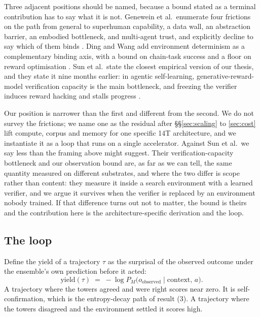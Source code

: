 \documentclass[11pt]{article}
\begin{document}
Three adjacent positions should be named, because a bound stated as a terminal contribution has to say what it is not. Genewein et al.\ enumerate four frictions on the path from general to superhuman capability, a data wall, an abstraction barrier, an embodied bottleneck, and multi-agent trust, and explicitly decline to say which of them binds \cite{genewein2026asi}. Ding and Wang add environment determinism as a complementary binding axis, with a bound on chain-task success and a floor on reward optimisation \cite{ding2026grounded}. Sun et al.\ state the closest empirical version of our thesis, and they state it nine months earlier: in agentic self-learning, generative-reward-model verification capacity is the main bottleneck, and freezing the verifier induces reward hacking and stalls progress \cite{sun2025agentic}.

Our position is narrower than the first and different from the second. We do not survey the frictions; we name one as the residual after \S\S\ref{sec:scaling} to \ref{sec:cost} lift compute, corpus and memory for one specific 14T architecture, and we instantiate it as a loop that runs on a single accelerator. Against Sun et al.\ we say less than the framing above might suggest. Their verification-capacity bottleneck and our observation bound are, as far as we can tell, the same quantity measured on different substrates, and where the two differ is scope rather than content: they measure it inside a search environment with a learned verifier, and we argue it survives when the verifier is replaced by an environment nobody trained. If that difference turns out not to matter, the bound is theirs and the contribution here is the architecture-specific derivation and the loop.

\subsection{The loop}

Define the yield of a trajectory $\tau$ as the surprisal of the observed outcome under the ensemble's own prediction before it acted:
\begin{equation}
\mathrm{yield}(\tau) \;=\; -\log P_M\bigl(o_{\text{observed}} \mid \text{context},\, a\bigr).
\label{eq:yield}
\end{equation}
A trajectory where the towers agreed and were right scores near zero. It is self-confirmation, which is the entropy-decay path of result (3). A trajectory where the towers disagreed and the environment settled it scores high.
\end{document}
